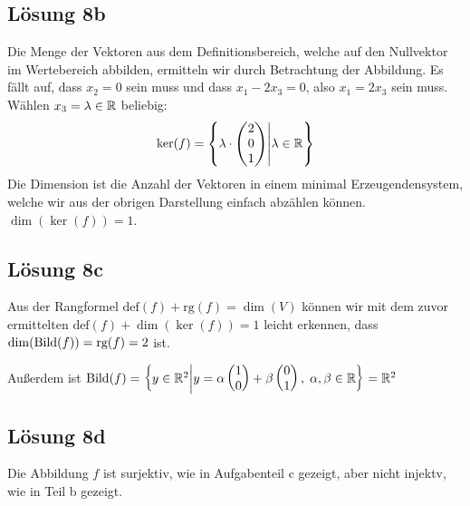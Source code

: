 \documentclass[main.tex]{subfiles}
\begin{document}
\subsection{Lösung 8b}
Die Menge der Vektoren aus dem Definitionsbereich, welche auf den Nullvektor im Wertebereich abbilden, ermitteln wir durch Betrachtung der Abbildung. Es fällt auf, dass $x_2 = 0$ sein muss und dass $x_1-2x_3 = 0$, also $x_1 = 2x_3$ sein muss. Wählen $x_3=\lambda \in \mathbb{R}$ beliebig:
$$
    \ker(f) = \left\{ \lambda \cdot \vektor{2 \\ 0 \\ 1} \middle| \lambda \in \R \right\}
$$
Die Dimension ist die Anzahl der Vektoren in einem minimal Erzeugendensystem, welche wir aus der obrigen Darstellung einfach abzählen können. $\dim(\ker(f)) = 1$.

\subsection{Lösung 8c}
Aus der Rangformel $\text{def}(f) + \text{rg}(f) = \dim(V)$ können wir mit dem zuvor ermittelten $\text{def}(f) + \dim(\ker(f)) = 1$ leicht erkennen, dass $\dim(\operatorname{Bild}(f)) = \text{rg}(f) = 2$ ist.

Außerdem ist $\Bild(f) = \left\{y\in \R^2 \middle| y=\alpha \vektor{1\\0} + \beta \vektor{0\\1},\; \alpha,\beta \in \R \right\} = \R^2$

\subsection{Lösung 8d}
Die Abbildung $f$ ist surjektiv, wie in Aufgabenteil c gezeigt, aber nicht injektv, wie in Teil b gezeigt.
\end{document}
